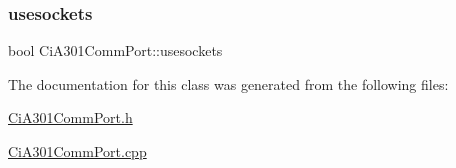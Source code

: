 \mbox{\label{classCiA301CommPort_a579e0de814111bde3bbe18cceb76ce64}} 
\subsubsection{\texorpdfstring{usesockets}{usesockets}}
{\footnotesize\ttfamily bool Ci\+A301\+Comm\+Port\+::usesockets\hspace{0.3cm}{\ttfamily [private]}}



The documentation for this class was generated from the following files\+:\begin{DoxyCompactItemize}
\item 
\hyperlink{CiA301CommPort_8h}{Ci\+A301\+Comm\+Port.\+h}\item 
\hyperlink{CiA301CommPort_8cpp}{Ci\+A301\+Comm\+Port.\+cpp}\end{DoxyCompactItemize}

